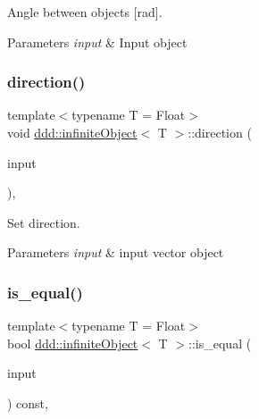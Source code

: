 Angle between objects \mbox{[}rad\mbox{]}. 


\begin{DoxyParams}{Parameters}
{\em input} & Input object \\
\hline
\end{DoxyParams}
\mbox{\label{classddd_1_1infinite_object_a1940ac3d87fc2ca742ca036c866736e8}} 
\subsubsection{\texorpdfstring{direction()}{direction()}}
{\footnotesize\ttfamily template$<$typename T = Float$>$ \\
void \hyperlink{classddd_1_1infinite_object}{ddd\+::infinite\+Object}$<$ T $>$\+::direction (\begin{DoxyParamCaption}\item[{const \hyperlink{classddd_1_1vector}{vector}$<$ T $>$ \&}]{input }\end{DoxyParamCaption})\hspace{0.3cm}{\ttfamily [inline]}, {\ttfamily [inherited]}}



Set direction. 


\begin{DoxyParams}{Parameters}
{\em input} & input vector object \\
\hline
\end{DoxyParams}
\mbox{\label{classddd_1_1infinite_object_a64089c7dadb2ec0b414b155f5bd43339}} 
\subsubsection{\texorpdfstring{is\+\_\+equal()}{is\_equal()}}
{\footnotesize\ttfamily template$<$typename T = Float$>$ \\
bool \hyperlink{classddd_1_1infinite_object}{ddd\+::infinite\+Object}$<$ T $>$\+::is\+\_\+equal (\begin{DoxyParamCaption}\item[{const \hyperlink{classddd_1_1infinite_object}{infinite\+Object}$<$ T $>$ \&}]{input }\end{DoxyParamCaption}) const\hspace{0.3cm}{\ttfamily [inline]}, {\ttfamily [inherited]}}



